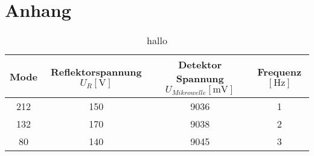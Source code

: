 \section{Anhang}

\begin{table}
    \centering
    \caption{hallo}
    \label{tab:Messreihe1.1}
    \begin{tabular}{c || c c c}
        \toprule
        Mode & Reflektorspannung $U_{R} [\si{\volt}] $ & Detektor Spannung $ U_{Mikrowelle} [\si{\milli\volt}] $ & Frequenz $[\si{\hertz}]$ \\
        \midrule
        212      &     150          &               9036        &        1  \\
        132      &     170          &               9038        &        2  \\
        80       &     140          &               9045        &        3  \\
    \end{tabular}
\end{table}